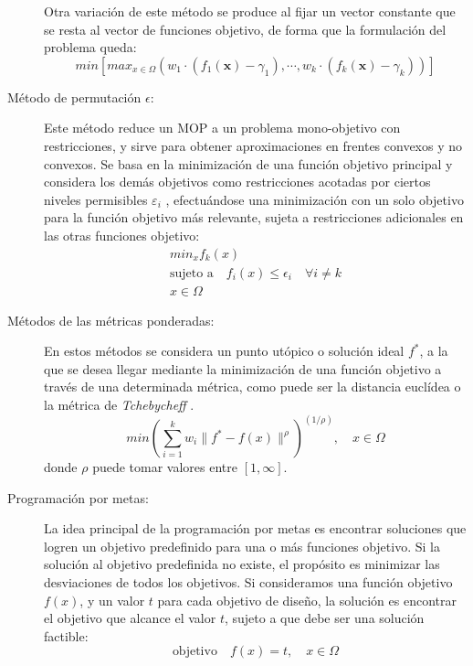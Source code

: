 \begin{description}
Otra variación de este método se produce al fijar un vector constante que se resta al
vector de funciones objetivo, de forma que la formulación del problema queda:
\begin{displaymath}
min\left[ max_{x\in \Omega}\left(w_{1} \cdot
\left(f_{1}(\mathbf{x})-\gamma_{1}\right),\cdots,w_{k} \cdot
\left(f_{k}(\mathbf{x})-\gamma_{k}\right)\right) \right]
\end{displaymath}
\item [Método de permutación $\epsilon$:] Este método reduce un MOP a un problema
mono-objetivo con restricciones, y sirve para obtener aproximaciones en frentes convexos y
no convexos. Se basa en la minimización de una función objetivo principal y  considera  los
demás objetivos como restricciones acotadas por ciertos  niveles permisibles  $\varepsilon_{i}$
, efectuándose una minimización con un solo objetivo para la función objetivo más
relevante, sujeta a restricciones adicionales en las otras funciones objetivo:
\begin{gather} \nonumber
min_{x}f_{k}(x) \\ \nonumber
\text{sujeto a} \quad  f_{i}(x)\leq\epsilon_{i} \quad \forall i\neq k \\ \nonumber
x \in \Omega \nonumber
\end{gather}
\item [Métodos de las métricas ponderadas:] En estos métodos se considera un punto
utópico o solución ideal $f^*$, a la que se desea llegar mediante la minimización de una
función objetivo a través de una determinada métrica, como puede ser la distancia euclídea
o la métrica de \textit{Tchebycheff} \cite{Karlin1966}.
\begin{displaymath}
min \left( \sum_{i=1}^k w_{i}	\parallel f^*-f(x)\parallel^\rho\right) ^{(1/\rho)}, \quad
{x\in\Omega}
\end{displaymath}
donde $\rho$ puede tomar valores entre $\left[ 1,\infty\right]$.
\item [Programación por metas:] La idea principal de la programación por metas es
encontrar soluciones que logren un objetivo predefinido para una o más funciones
objetivo. Si la solución al objetivo predefinida no existe, el propósito es minimizar las
desviaciones de todos los objetivos.
Si consideramos una función objetivo $f(x)$, y un valor $t$ para cada objetivo de diseño,
la solución es encontrar el objetivo que alcance el valor $t$, sujeto a que debe ser una
solución factible:
\begin{displaymath}
 \text{objetivo} \quad f(x)=t, \quad x\in\Omega

\end{displaymath}
\end{description}
